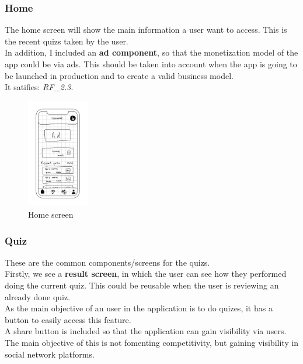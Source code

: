 \subsubsection{Home}
The home screen will show the main information a user want to access. This is the recent quizs taken by the user. \\

In addition, I included an \textbf{ad component}, so that the monetization model of the app could be via ads. This should be taken into account when the app is going to be launched in production and to create a valid business model.\\

It satifies: \textit{RF\_2.3}. \\
\begin{figure}[H]
    \centering
        \includegraphics[width=0.24\textwidth]{assets/screens/Home.png}
    \caption{Home screen}
    \label{fig:design_home}
\end{figure}

\subsubsection{Quiz}
These are the common components/screens for the quizs. \\

Firstly, we see a \textbf{result screen}, in which the user can see how they performed doing the current quiz. This could be reusable when the user is reviewing an already done quiz. \\
As the main objective of an user in the application is to do quizes, it has a button to easily access this feature. \\
A share button is included so that the application can gain visibility via users. The main objective of this is not fomenting competitivity, but gaining visibility in social network platforms. \\

